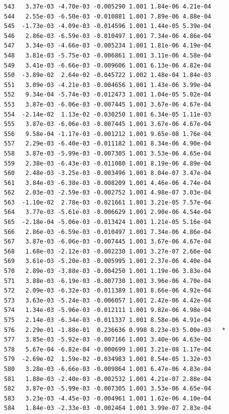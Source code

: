 \documentclass[
  letterpaper,
  DIV=11,
  numbers=noendperiod]{scrartcl}
\begin{document}
\begin{verbatim}
543   3.37e-03 -4.70e-03 -0.005290 1.001 1.84e-06 4.21e-04    
544   2.55e-03 -6.50e-03 -0.010881 1.001 7.89e-06 4.88e-04    
545  -1.73e-03 -4.09e-03 -0.014596 1.001 1.44e-05 5.39e-04    
546   2.86e-03 -6.59e-03 -0.010497 1.001 7.34e-06 4.86e-04    
547   3.34e-03 -4.66e-03 -0.005234 1.001 1.81e-06 4.19e-04    
548   3.81e-03 -5.75e-03 -0.006861 1.001 3.11e-06 4.58e-04    
549   3.41e-03 -6.66e-03 -0.009606 1.001 6.13e-06 4.82e-04    
550  -3.89e-02  2.64e-02 -0.045722 1.002 1.48e-04 1.84e-03    
551   3.09e-03 -4.21e-03 -0.004656 1.001 1.43e-06 3.99e-04    
552   9.34e-04 -5.74e-03 -0.012473 1.001 1.04e-05 5.02e-04    
553   3.87e-03 -6.06e-03 -0.007445 1.001 3.67e-06 4.67e-04    
554  -2.14e-02  1.13e-02 -0.030250 1.001 6.34e-05 1.11e-03    
555   3.87e-03 -6.06e-03 -0.007445 1.001 3.67e-06 4.67e-04    
556   9.58e-04 -1.17e-03 -0.001212 1.001 9.65e-08 1.76e-04    
557   2.29e-03 -6.40e-03 -0.011182 1.001 8.34e-06 4.90e-04    
558   3.87e-03 -5.99e-03 -0.007305 1.001 3.53e-06 4.65e-04    
559   2.38e-03 -6.43e-03 -0.011080 1.001 8.19e-06 4.89e-04    
560   2.48e-03 -3.25e-03 -0.003496 1.001 8.04e-07 3.47e-04    
561   3.84e-03 -6.38e-03 -0.008209 1.001 4.46e-06 4.74e-04    
562   2.03e-03 -2.59e-03 -0.002752 1.001 4.98e-07 3.03e-04    
563  -1.10e-02  2.78e-03 -0.021661 1.001 3.21e-05 7.57e-04    
564   3.77e-03 -5.61e-03 -0.006629 1.001 2.90e-06 4.54e-04    
565  -2.18e-04 -5.06e-03 -0.013424 1.001 1.21e-05 5.16e-04    
566   2.86e-03 -6.59e-03 -0.010497 1.001 7.34e-06 4.86e-04    
567   3.87e-03 -6.06e-03 -0.007445 1.001 3.67e-06 4.67e-04    
568   1.68e-03 -2.12e-03 -0.002230 1.001 3.27e-07 2.66e-04    
569   3.61e-03 -5.20e-03 -0.005995 1.001 2.37e-06 4.40e-04    
570   2.89e-03 -3.88e-03 -0.004250 1.001 1.19e-06 3.83e-04    
571   3.88e-03 -6.19e-03 -0.007730 1.001 3.96e-06 4.70e-04    
572   2.09e-03 -6.32e-03 -0.011389 1.001 8.66e-06 4.92e-04    
573   3.63e-03 -5.24e-03 -0.006057 1.001 2.42e-06 4.42e-04    
574   1.34e-03 -5.96e-03 -0.012111 1.001 9.82e-06 4.98e-04    
575   2.14e-03 -6.34e-03 -0.011337 1.001 8.58e-06 4.91e-04    
576   2.29e-01 -1.88e-01  0.236636 0.998 8.23e-03 5.00e-03   *
577   3.85e-03 -5.92e-03 -0.007166 1.001 3.40e-06 4.63e-04    
578   5.67e-04 -6.82e-04 -0.000699 1.001 3.21e-08 1.17e-04    
579  -2.69e-02  1.59e-02 -0.034983 1.001 8.54e-05 1.32e-03    
580   3.28e-03 -6.66e-03 -0.009864 1.001 6.47e-06 4.83e-04    
581   1.88e-03 -2.40e-03 -0.002532 1.001 4.21e-07 2.88e-04    
582   3.87e-03 -5.99e-03 -0.007305 1.001 3.53e-06 4.65e-04    
583   3.23e-03 -4.45e-03 -0.004961 1.001 1.62e-06 4.10e-04    
584   1.84e-03 -2.33e-03 -0.002464 1.001 3.99e-07 2.83e-04    

\end{verbatim}
\end{document}
